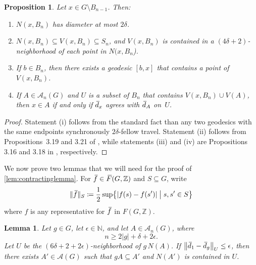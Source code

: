 \documentclass[11pt,letterpaper]{amsart}
\newtheorem{proposition}[theorem]{Proposition}
\newtheorem{lemma}[theorem]{Lemma}
\theoremstyle{definition}
\newcommand{\Z}{\mathbb{Z}}
\newcommand{\N}{\mathbb{N}}
\newcommand{\A}{\mathcal{A}}
\newcommand{\oF}{\mkern 3.75mu\overline{\mkern-3.75mu F}}
\newcommand{\od}{\mkern 3mu\overline{\mkern-3mu d\mkern 1.5mu}\mkern-1.5mu}
\newcommand{\of}{\mkern 3.5mu\overline{\mkern-3.5mu f\mkern0.75mu}\mkern-0.75mu}
\begin{document}
\begin{proposition}\label{prop:PropertiesSets}
Let $x\in G\setminus B_{n-1}$. Then:
\begin{enumerate}
\item \label{part:DiameterN} $N(x,B_n)$ has diameter at most $2\delta$.\smallskip

\item \label{part:PNearN} $N(x,B_n)\subseteq V(x,B_n)\subseteq S_n$, and $V(x,B_n)$ is contained in a $(4\delta+2)$-neighborhood of each point in $N(x,B_n$).
\smallskip

\item \label{part:PropertyV} If $b\in B_n$, then there exists a geodesic $[b,x]$ that contains a point of~$V(x,B_n)$. \smallskip

\item \label{part:JustCheckU} If $A\in\A_n(G)$ and $U$ is a subset of $B_n$ that contains  $V(x,B_n)\cup V(A)$,   then $x\in A$ if and only if $\od_x$ agrees with $\od_A$ on~$U$.
\end{enumerate}
\end{proposition}
\begin{proof}
Statement (i) follows from the standard fact than any two geodesics with the same endpoints synchronously $2\delta$-fellow travel. 
 Statement (ii) follows from Propositions~3.19 and 3.21 of \cite{BelkBleakMatucci}, while statements (iii) and (iv) are Propositions 3.16 and 3.18 in \cite{BelkBleakMatucci}, respectively.
\end{proof}

We now prove two lemmas that we will need for the proof of \cref{lem:contractinglemma}.  For $\of\in\oF(G,\Z)$ and $S\subseteq G$, write
\[
\|\of\|_S \coloneqq \frac{1}{2}\sup\bigl\{|f(s)-f(s')| \;\bigr|\; s,s'\in S\bigr\} 
\]
where $f$ is any representative for $\of$ in $F(G,\Z)$.

\begin{lemma}\label{lem:MappingAtomsIntoAtoms}
Let $g\in G$, let $\epsilon\in\N$, and let $A\in \A_n(G)$, where
\begin{equation}\label{eq:n}
n\geq 2|g|+\delta+2\epsilon.
\end{equation}
Let $U$ be the $(6\delta+2+2\epsilon)$-neighborhood of $g\,N(A)$. If\/ $\bigl\|\od_{1}-\od_{g}\bigr\|_U \leq \epsilon$, then there exists $A'\in \A(G)$ such that $gA\subseteq A'$ and $N(A')$ is contained in $U$.
\end{lemma}
\end{document}
